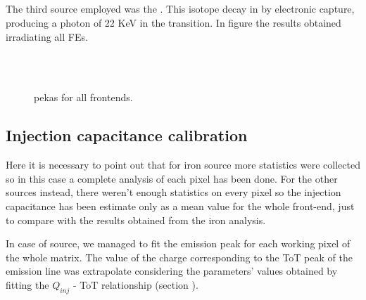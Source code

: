 \subsection{}

The third source employed was the . This isotope decay in  by electronic capture, producing a photon of 22 KeV in the transition. In figure  the results obtained irradiating all FEs. 

\begin{figure}[h!]
\centering
{}\quad
{}\\
\quad
{}\\
\caption{ pekas for all frontends.}
\label{fig:cd_all}
\end{figure}



\subsection{Injection capacitance calibration}

Here it is necessary to point out that for iron source more statistics were collected so in this case a complete analysis of each pixel has been done. For the other sources instead, there weren't enough statistics on every pixel so the injection capacitance has been estimate only as a mean value for the whole front-end, just to compare with the results obtained from the iron analysis.  

In case of  source, we managed to fit the emission peak for each working pixel of the whole matrix. The value of the charge corresponding to the ToT peak of the emission line was extrapolate considering the parameters' values obtained by fitting the $Q_{inj}$ - ToT relationship (section ). \\

